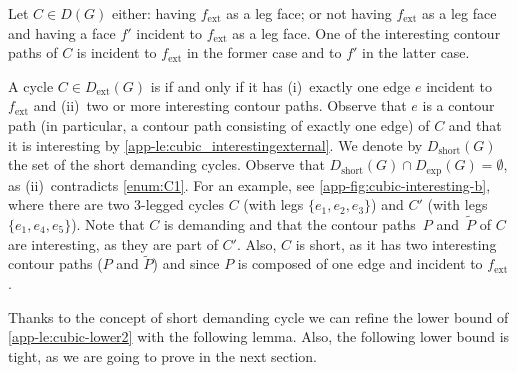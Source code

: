 \documentclass[runningheads]{llncs}
\newcommand{\ext}{\operatorname{ext}}
\newcommand{\short}{\operatorname{short}}
\let\emph\relax\DeclareTextFontCommand{\emph}{\color{dark blue}\em}
\begin{document}
\begin{lemma}
\label{app-le:cubic_interestingexternal}
Let $C\in D(G)$ either: having $f_{\ext}$ as a leg face; or not having $f_{\ext}$ as a leg face and having a face $f'$ incident to $f_{\ext}$ as a leg face. One of the interesting contour paths of $C$ is incident to $f_{\ext}$ in the former case and to $f'$ in the latter case.
\end{lemma}

A cycle $C\in D_{\ext}(G)$ is \emph{short} if and only if it has (i)~exactly one edge $e$ incident to $f_{\ext}$ and (ii)~two or more interesting contour paths.  Observe that $e$ is a contour path (in particular, a contour path consisting of exactly one edge) of $C$ and that it is interesting by \cref{app-le:cubic_interestingexternal}. We denote by $D_{\short}(G)$ the set of the short demanding cycles. Observe that $D_{\short}(G)\cap D_{\exp}(G)=\emptyset$, as (ii)~contradicts \ref{enum:C1}.  For an example, see \cref{app-fig:cubic-interesting-b}, where there are two 3-legged cycles $C$ (with legs $\{e_1,e_2,e_3\}$) and $C'$ (with legs $\{e_1,e_4,e_5\}$). 
Note that $C$ is demanding and that the contour paths~$P$ and~$\tilde{P}$ of $C$ are interesting, as they are part of $C'$. 
Also, $C$ is short, as it has two interesting contour paths ($P$ and $\tilde{P}$) and since $P$ is composed of one edge and incident to $f_{\ext}$. 

Thanks to the concept of short demanding cycle we can refine the lower bound of \cref{app-le:cubic-lower2} with the following lemma. Also, the following lower bound is tight, as we are going to prove in the next section.

\cubiclower*
\label{app-le:cubic-lower3*}
\end{document}
